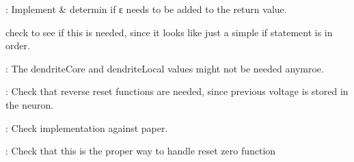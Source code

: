 
\begin{DoxyRefList}
\item[\label{todo__todo000001}%
\hypertarget{todo__todo000001}{}%
global\+Scope$>$ Global \hyperlink{assist_8h_a4d378196b7fceed090d64ec8820b4065}{get\+Current\+Big\+Tick} (tw\+\_\+stime now)]\+: Implement \& determin if ε needs to be added to the return value. 
\item[\label{todo__todo000005}%
\hypertarget{todo__todo000005}{}%
global\+Scope$>$ Global \hyperlink{neuron_8h_a92d5882a15e11e2a6733483d51428e46}{neuron\+Should\+Fire} (\hyperlink{structneuron_state}{neuron\+State} $\ast$st)]check to see if this is needed, since it looks like just a simple if statement is in order. 
\item[\label{todo__todo000006}%
\hypertarget{todo__todo000006}{}%
Global \hyperlink{structneuron_state_a4199c14c5aabfd52f441e01623bdc84c}{neuron\+State\+:\+:dendrite\+Global\+Dest} ]\+: The dendrite\+Core and dendrite\+Local values might not be needed anymroe.  
\item[\label{todo__todo000002}%
\hypertarget{todo__todo000002}{}%
Module \hyperlink{neuron_8c_amgrpb71b6f136d39fa6c989fa9f8bce28fa9}{Reset\+Functions} ]\+: Check that reverse reset functions are needed, since previous voltage is stored in the neuron.  
\item[\label{todo__todo000003}%
\hypertarget{todo__todo000003}{}%
global\+Scope$>$ Global \hyperlink{neuron_8h_a2e78d7d2b70bf7349c3854b3727dcc25}{reset\+Linear} (void $\ast$neuron\+State)]\+: Check implementation against paper. 
\item[\label{todo__todo000004}%
\hypertarget{todo__todo000004}{}%
global\+Scope$>$ Global \hyperlink{neuron_8h_ae53276ccdb759ba1ea09806cbf9fc940}{reverse\+Reset\+Zero} (void $\ast$neuron\+State)]\+: Check that this is the proper way to handle reset zero function 
\end{DoxyRefList}